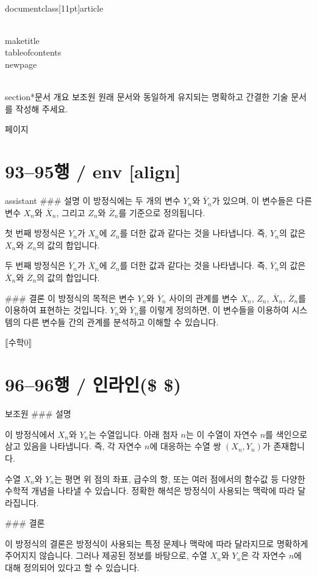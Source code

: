 \\documentclass[11pt]{article}
\begin{document}
\\maketitle
\\tableofcontents
\\newpage

\\section*{문서 개요}
보조원
원래 문서와 동일하게 유지되는 명확하고 간결한 기술 문서를 작성해 주세요.

\새 페이지

\section*{93–95행 / env [align]}
assistant
### 설명
이 방정식에는 두 개의 변수 \( Y_n \)와 \( \overline{Y}_n \)가 있으며, 이 변수들은 다른 변수 \( X_n \)와 \( \overline{X}_n \), 그리고 \( Z_n \)와 \( \overline{Z}_n \)를 기준으로 정의됩니다.

첫 번째 방정식은 \( Y_n \)가 \( X_n \)에 \( Z_n \)를 더한 값과 같다는 것을 나타냅니다. 즉, \( Y_n \)의 값은 \( X_n \)와 \( Z_n \)의 값의 합입니다.

두 번째 방정식은 \( \overline{Y}_n \)가 \( \overline{X}_n \)에 \( \overline{Z}_n \)를 더한 값과 같다는 것을 나타냅니다. 즉, \( \overline{Y}_n \)의 값은 \( \overline{X}_n \)와 \( \overline{Z}_n \)의 값의 합입니다.

### 결론
이 방정식의 목적은 변수 \( Y_n \)와 \( \overline{Y}_n \) 사이의 관계를 변수 \( X_n \), \( Z_n \), \( \overline{X}_n \), \( \overline{Z}_n \)를 이용하여 표현하는 것입니다. \( Y_n \)와 \( \overline{Y}_n \)를 이렇게 정의하면, 이 변수들을 이용하여 시스템의 다른 변수들 간의 관계를 분석하고 이해할 수 있습니다.

⟦수학0⟧

\section*{96–96행 / 인라인(\$ \$) }
보조원
### 설명

이 방정식에서 \(X_n\)와 \(Y_n\)는 수열입니다. 아래 첨자 \(n\)는 이 수열이 자연수 \(n\)를 색인으로 삼고 있음을 나타냅니다. 즉, 각 자연수 \(n\)에 대응하는 수열 쌍 \((X_n, Y_n)\)가 존재합니다.

수열 \(X_n\)와 \(Y_n\)는 평면 위 점의 좌표, 급수의 항, 또는 여러 점에서의 함수값 등 다양한 수학적 개념을 나타낼 수 있습니다. 정확한 해석은 방정식이 사용되는 맥락에 따라 달라집니다.

### 결론

이 방정식의 결론은 방정식이 사용되는 특정 문제나 맥락에 따라 달라지므로 명확하게 주어지지 않습니다. 그러나 제공된 정보를 바탕으로, 수열 \(X_n\)와 \(Y_n\)은 각 자연수 \(n\)에 대해 정의되어 있다고 할 수 있습니다.
\end{document}
